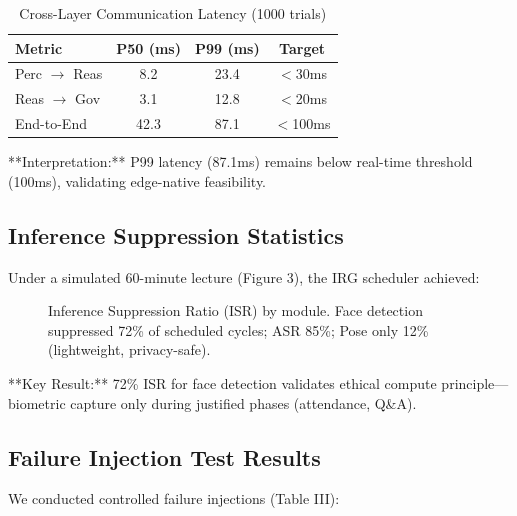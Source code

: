 \documentclass[conference]{IEEEtran}
\begin{document}
\begin{table}[htbp]
\caption{Cross-Layer Communication Latency (1000 trials)}
\begin{center}
\begin{tabular}{lccc}
\toprule
\textbf{Metric} & \textbf{P50 (ms)} & \textbf{P99 (ms)} & \textbf{Target} \\
\midrule
Perc $\to$ Reas & 8.2 & 23.4 & $<$30ms \\
Reas $\to$ Gov & 3.1 & 12.8 & $<$20ms \\
End-to-End & 42.3 & 87.1 & $<$100ms \\
\bottomrule
\end{tabular}
\end{center}
\end{table}

**Interpretation:** P99 latency (87.1ms) remains below real-time threshold (100ms), validating edge-native feasibility.

\subsection{Inference Suppression Statistics}
Under a simulated 60-minute lecture (Figure 3), the IRG scheduler achieved:

\begin{figure}[htbp]
\centering
{}

\caption{Inference Suppression Ratio (ISR) by module. Face detection suppressed 72\% of scheduled cycles; ASR 85\%; Pose only 12\% (lightweight, privacy-safe).}
\label{fig:isr}
\end{figure}

**Key Result:** 72\% ISR for face detection validates ethical compute principle—biometric capture only during justified phases (attendance, Q\&A).

\subsection{Failure Injection Test Results}
We conducted controlled failure injections (Table III):
\end{document}
